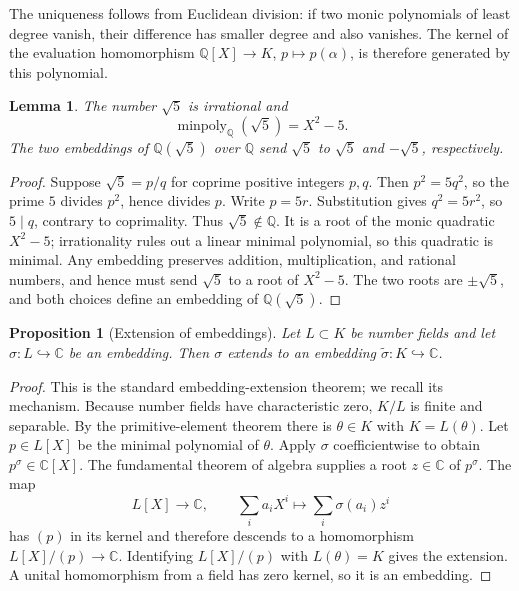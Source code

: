 \documentclass[11pt]{article}
\numberwithin{equation}{section}
\newtheorem{proposition}[theorem]{Proposition}
\newtheorem{lemma}[theorem]{Lemma}
\theoremstyle{definition}
\theoremstyle{remark}
\newcommand{\Q}{\mathbb{Q}}
\newcommand{\C}{\mathbb{C}}
\newcommand{\minpoly}{\operatorname{minpoly}}
\begin{document}
The uniqueness follows from Euclidean division: if two monic polynomials of
least degree vanish, their difference has smaller degree and also vanishes.
The kernel of the evaluation homomorphism
\(\Q[X]\to K\), \(p\mapsto p(\alpha)\), is therefore generated by this
polynomial.

\begin{lemma}
\label{lem:sqrt5-minpoly}
The number \(\sqrt5\) is irrational and
\[
 \minpoly_\Q(\sqrt5)=X^2-5.
\]
The two embeddings of \(\Q(\sqrt5)\) over \(\Q\) send \(\sqrt5\) to
\(\sqrt5\) and \(-\sqrt5\), respectively.
\end{lemma}

\begin{proof}
Suppose \(\sqrt5=p/q\) for coprime positive integers \(p,q\).  Then
\(p^2=5q^2\), so the prime \(5\) divides \(p^2\), hence divides \(p\).
Write \(p=5r\).  Substitution gives \(q^2=5r^2\), so \(5\mid q\), contrary
to coprimality.  Thus \(\sqrt5\notin\Q\).  It is a root of the monic
quadratic \(X^2-5\); irrationality rules out a linear minimal polynomial,
so this quadratic is minimal.  Any embedding preserves addition,
multiplication, and rational numbers, and hence must send \(\sqrt5\) to a
root of \(X^2-5\).  The two roots are \(\pm\sqrt5\), and both choices define
an embedding of \(\Q(\sqrt5)\).
\end{proof}

\begin{proposition}[Extension of embeddings]
\label{prop:embedding-extension}
Let \(L\subset K\) be number fields and let
\(\sigma:L\hookrightarrow\C\) be an embedding.  Then \(\sigma\) extends to
an embedding \(\widetilde\sigma:K\hookrightarrow\C\).
\end{proposition}

\begin{proof}
This is the standard embedding-extension theorem; we recall its mechanism.
Because number fields have characteristic zero, \(K/L\) is finite and
separable.  By the primitive-element theorem there is \(\theta\in K\) with
\(K=L(\theta)\).  Let \(p\in L[X]\) be the minimal polynomial of \(\theta\).
Apply \(\sigma\) coefficientwise to obtain \(p^\sigma\in\C[X]\).  The
fundamental theorem of algebra supplies a root \(z\in\C\) of
\(p^\sigma\).  The map
\[
 L[X]\longrightarrow\C,
 \qquad \sum_i a_iX^i\longmapsto\sum_i\sigma(a_i)z^i
\]
has \((p)\) in its kernel and therefore descends to a homomorphism
\(L[X]/(p)\to\C\).  Identifying \(L[X]/(p)\) with \(L(\theta)=K\) gives the
extension.  A unital homomorphism from a field has zero kernel, so it is an
embedding.
\end{proof}
\end{document}
